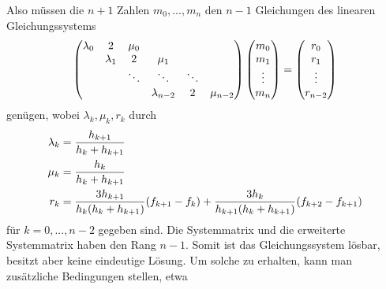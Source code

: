 Also müssen die $n+1$ Zahlen $m_0,...,m_n$ den $n-1$ Gleichungen des linearen Gleichungssystems 
\begin{align}
	\begin{pmatrix}
		\lambda_0 & 2 & \mu_0 & & & \\
		 & \lambda_1 & 2 & \mu_1 & & \\
		 & & \ddots & \ddots & \ddots & \\
		 & & & \lambda_{n-2} & 2 & \mu_{n-2}
	\end{pmatrix}
	\begin{pmatrix}
		m_0 \\ m_1 \\ \vdots \\ m_n
	\end{pmatrix}
	= \begin{pmatrix}
	 r_0 \\ r_1 \\ \vdots \\ r_{n-2}
	\end{pmatrix}\notag
\end{align}
genügen, wobei $\lambda_k,\mu_k,r_k$ durch
\begin{align}
	\lambda_k &= \frac{h_{k+1}}{h_k+h_{k+1}} \notag \\
	\mu_k &= \frac{h_k}{h_k + h_{k+1}}\notag \\
	r_k &= \frac{3h_{k+1}}{h_k(h_k+h_{k+1})}(f_{k+1}-f_k) + \frac{3h_k}{h_{k+1}(h_k+h_{k+1})}(f_{k+2} - f_{k+1})\notag
\end{align}
für $k=0,...,n-2$ gegeben sind. Die Systemmatrix und die erweiterte Systemmatrix haben den Rang $n-1$. Somit ist das Gleichungssystem lösbar, besitzt aber keine eindeutige Lösung. Um solche zu erhalten, kann man zusätzliche Bedingungen stellen, etwa
